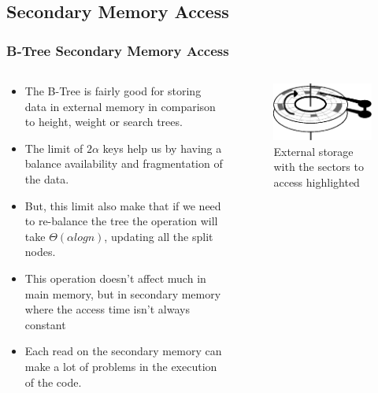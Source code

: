 \documentclass{beamer}
\begin{document}
\begin{frame}
    \subsection{Secondary Memory Access}
    \frametitle{B-Tree Secondary Memory Access}
    \begin{columns}
        \begin{column}{.7\textwidth}
            \begin{block}{}
                \begin{itemize}
                    \item The B-Tree is fairly good for storing data in external memory in comparison to height, weight or search trees.
                    \item The limit of \(2\alpha\) keys help us by having a balance availability and fragmentation of the data.
                    \item But, this limit also make that if we need to re-balance the tree the 
                        operation will take \(\Theta\left(\alpha log n\right)\), updating all the split nodes.
                    \item This operation doesn't affect much in main memory, 
                        but in secondary memory where the access time isn't always constant 
                    \item Each read on the secondary memory can make a lot of problems in the execution of the code.
                \end{itemize}
            \end{block}
        \end{column}
        \begin{column}{.35\textwidth}
            \begin{block}{}
                \begin{figure}[h!]
                    \includegraphics[width=\linewidth]{resources/made/external_storage_wblocks.eps}
                    \caption{External storage with the sectors to access highlighted}
                \end{figure}
            \end{block}
        \end{column}
    \end{columns}


\end{frame}
\end{document}
